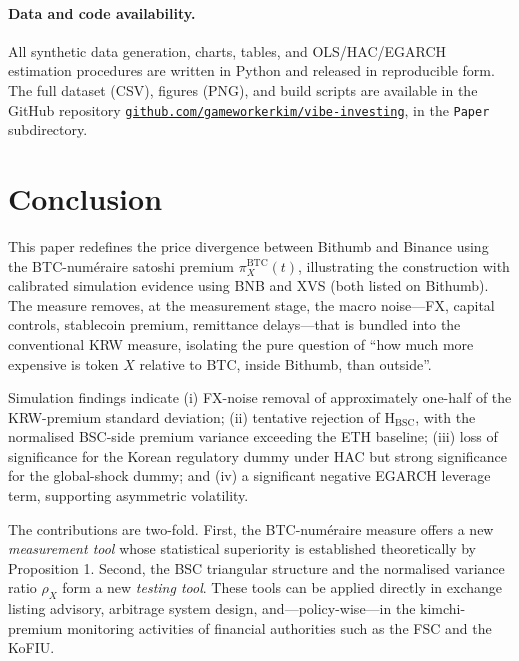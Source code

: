 \documentclass[11pt,a4paper]{article}
\begin{document}
\paragraph{Data and code availability.}
All synthetic data generation, charts, tables, and OLS/HAC/EGARCH estimation procedures are written
in Python and released in reproducible form. The full dataset (CSV), figures (PNG), and build
scripts are available in the GitHub repository
\href{https://github.com/gameworkerkim/vibe-investing}{\texttt{github.com/gameworkerkim/vibe-investing}},
in the \texttt{Paper} subdirectory.

\section{Conclusion}

This paper redefines the price divergence between Bithumb and Binance using the BTC-num\'eraire
satoshi premium $\pi^{\text{BTC}}_X(t)$, illustrating the construction with calibrated simulation
evidence using BNB and XVS (both listed on Bithumb). The measure removes, at the measurement stage,
the macro noise---FX, capital controls, stablecoin premium, remittance delays---that is bundled
into the conventional KRW measure, isolating the pure question of ``how much more expensive is
token $X$ relative to BTC, inside Bithumb, than outside''.

Simulation findings indicate (i) FX-noise removal of approximately one-half of the KRW-premium
standard deviation; (ii) tentative rejection of $\mathrm{H_{BSC}}$, with the normalised
BSC-side premium variance exceeding the ETH baseline; (iii) loss of significance for the Korean
regulatory dummy under HAC but strong significance for the global-shock dummy; and (iv) a
significant negative EGARCH leverage term, supporting asymmetric volatility.

The contributions are two-fold. First, the BTC-num\'eraire measure offers a new
\emph{measurement tool} whose statistical superiority is established theoretically by
Proposition 1. Second, the BSC triangular structure and the normalised variance ratio $\rho_X$ form
a new \emph{testing tool}. These tools can be applied directly in exchange listing advisory,
arbitrage system design, and---policy-wise---in the kimchi-premium monitoring activities of
financial authorities such as the FSC and the KoFIU.
\end{document}
